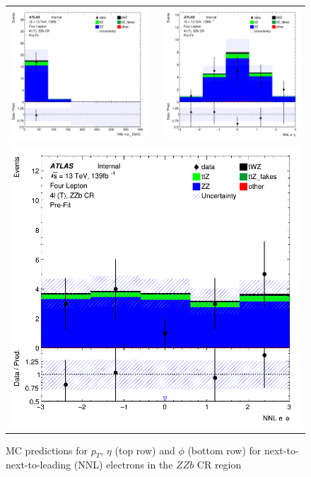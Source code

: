 \begin{figure}[htbp]
\centering
  \begin{tabular}{ccc}

    \includegraphics[width=.2\textwidth]{figures/PreFitPlots/lep4_ZZb_4T_NNL_el_pt} & &
    \includegraphics[width=.2\textwidth]{figures/PreFitPlots/lep4_ZZb_4T_NNL_el_eta} \\
    \multicolumn{3}{c}{\includegraphics[width=.2\textwidth]{figures/PreFitPlots/lep4_ZZb_4T_NNL_el_phi}}
  \end{tabular}
    \caption{MC predictions for $p_{T}$, $\eta$ (top row) and $\phi$ (bottom row) for next-to-next-to-leading (NNL) electrons in the $ZZb$ CR region}
  \label{fig:4lep-ZZb-CR-electronPlots}
\end{figure}
\clearpage

